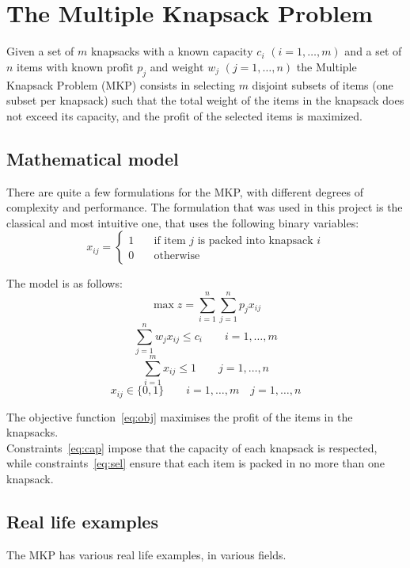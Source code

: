 \chapter{The Multiple Knapsack Problem}
Given a set of \(m\) knapsacks with a known \(\text{capacity } c_{i}\) \((i=1,\dots,m)\) and a set of \(n\) items with
known \(\text{profit } p_{j}\) and \(\text{weight } w_{j}\) \((j=1,\dots,n)\) the Multiple Knapsack Problem (MKP) consists in
selecting \(m\) disjoint subsets of items (one subset per knapsack) such that the total weight of the items in the knapsack
does not exceed its capacity, and the profit of the selected items is maximized.

\section{Mathematical model}
There are quite a few formulations for the MKP, with different degrees of
complexity and performance.
The formulation that was used in this project is the classical and most intuitive
one, that uses the following binary variables:
\[x_{ij}=
\begin{cases}
    1 & \quad \text{if item } j \text{ is packed into knapsack } i\\
    0 & \quad \text{otherwise}
\end{cases}
\]

The model is as follows:
\begin{equation}
    \label{eq:obj}
    \max{z} = \sum_{i=1}^{n} \sum_{j=1}^{n} p_{j} x_{ij}
\end{equation}
\begin{equation}
    \label{eq:cap}
    \sum_{j=1}^{n} w_{j} x_{ij} \leq c_{i} \qquad i=1,\dots,m
\end{equation}
\begin{equation}
    \label{eq:sel}
    \sum_{i=1}^{m} x_{ij} \leq 1 \qquad j=1,\dots,n
\end{equation}
\begin{equation}
    x_{ij} \in \{0,1\} \qquad i=1,\dots,m \quad j=1,\dots,n
\end{equation}

The objective function~\eqref{eq:obj} maximises the profit of the items in the knapsacks.\\
Constraints~\eqref{eq:cap} impose that the capacity of each knapsack is respected, while constraints~\eqref{eq:sel}
ensure that each item is packed in no more than one knapsack.

\section{Real life examples}
The MKP has various real life examples, in various fields.


